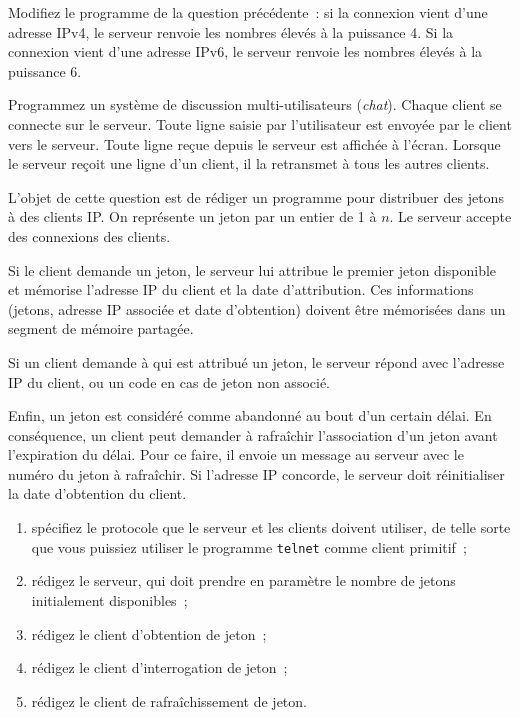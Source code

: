 \question

Modifiez le programme de la question précédente~: si la connexion
vient d'une adresse IPv4, le serveur renvoie les nombres élevés à
la puissance 4. Si la connexion vient d'une adresse IPv6, le serveur
renvoie les nombres élevés à la puissance 6.


\question

Programmez un système de discussion multi-utilisateurs (\textit
{chat\/}). Chaque client se connecte sur le serveur. Toute ligne
saisie par l'utilisateur est envoyée par le client vers le serveur.
Toute ligne reçue depuis le serveur est affichée à l'écran. Lorsque
le serveur reçoit une ligne d'un client, il la retransmet à tous
les autres clients.


\question

L'objet de cette question est de rédiger un programme pour distribuer
des jetons à des clients IP. On représente un jeton par un entier
de 1 à $n$. Le serveur accepte des connexions des clients.

Si le client demande un jeton, le serveur lui attribue le premier
jeton disponible et mémorise l'adresse IP du client et la date
d'attribution. Ces informations (jetons, adresse IP associée et
date d'obtention) doivent être mémorisées dans un segment de mémoire
partagée.

Si un client demande à qui est attribué un jeton, le serveur répond
avec l'adresse IP du client, ou un code en cas de jeton non associé.

Enfin, un jeton est considéré comme abandonné au bout d'un certain
délai. En conséquence, un client peut demander à rafraîchir
l'association d'un jeton avant l'expiration du délai. Pour ce faire,
il envoie un message au serveur avec le numéro du jeton à rafraîchir.
Si l'adresse IP concorde, le serveur doit réinitialiser la date
d'obtention du client.

\begin {enumerate}
    \item spécifiez le protocole que le serveur et les clients doivent
	utiliser, de telle sorte que vous puissiez utiliser le programme
	\texttt {telnet} comme client primitif~;
    \item rédigez le serveur, qui doit prendre en paramètre le
	nombre de jetons initialement disponibles~;
    \item rédigez le client d'obtention de jeton~;
    \item rédigez le client d'interrogation de jeton~;
    \item rédigez le client de rafraîchissement de jeton.
\end {enumerate}
